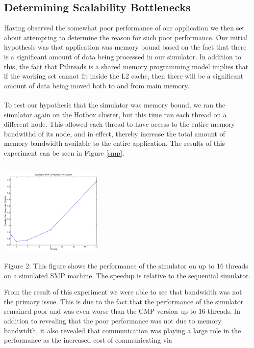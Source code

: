 \documentclass{article}
\begin{document}
\begin{multicols}{2}
\subsection{Determining Scalability Bottlenecks}
Having observed the somewhat poor performance of our application we then
set about attempting to determine the reason for such poor performance.
Our initial hypothesis was that application was memory bound based on the
fact that there is a significant amount of data being processed in our
simulator.  In addition to this, the fact that Pthreads is a shared memory
programming model implies that if the working set cannot fit inside the L2
cache, then there will be a significant amount of data being moved both to
and from main memory.\\
~\\
To test our hypothesis that the simulator was memory bound, we ran the
simulator again on the Hotbox cluster, but this time ran each thread on a
different node.  This allowed each thread to have access to the entire
memory bandwithd of its node, and in effect, thereby increase the total
amount of memory bandwidth available to the entire application.  The
results of this experiment can be seen in Figure \ref{smp}.\\
\begin{center}
\includegraphics[height=2in,width=2in]{smp.eps} \\
\small{Figure 2: This figure shows the performance of the simulator on
up to 16 threads on a simulated SMP machine.  The speedup is relative to
the sequential simulator.}
\end{center}
From the result of this experiment we were able to see that bandwidth was
not the primary issue.  This is due to the fact that the performance of
the simulator remained poor and was even worse than the CMP version up to
16 threads.  In addition to revealing that the poor performance was not
due to memory bandwidth, it also revealed that communication was playing a
large role in the performance as the increased cost of communicating via

\end{multicols}
\end{document}
